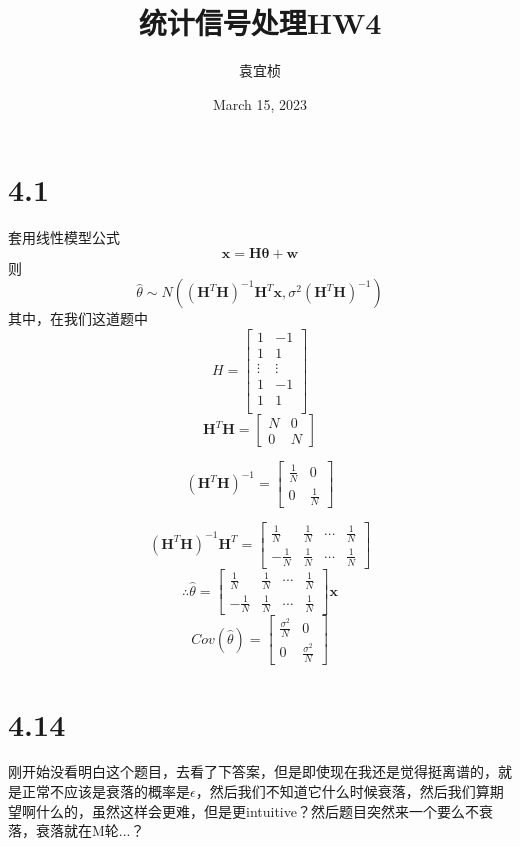 \documentclass{article}
\title{统计信号处理HW4}
\author{袁宜桢}
\date{March 15, 2023}
\begin{document}
\maketitle

\section{4.1}
套用线性模型公式
$$ \bm{x}=\bm{H\theta}+\bm{w} $$
则$$ \hat{\theta}\sim N((\bm{H}^T\bm{H})^{-1}\bm{H}^T\bm{x},\sigma^2(\bm{H}^T\bm{H})^{-1}) $$
其中，在我们这道题中$$H=\left[\begin{array}{cc}
   1  & -1 \\
   1  & 1  \\
   \vdots  & \vdots \\
   1  & -1 \\
   1  & 1  \\
\end{array}\right]$$
$$ \bm{H}^T\bm{H}=\left[ \begin{array}{cc}
   N  & 0 \\
   0  & N
\end{array} \right] $$

$$ (\bm{H}^T\bm{H})^{-1}=\left[ \begin{array}{cc}
   \frac{1}{N}  & 0 \\
   0  & \frac{1}{N}
\end{array} \right] $$

$$ (\bm{H}^T\bm{H})^{-1}\bm{H}^T=\left[ \begin{array}{cccc}
   \frac{1}{N}  & \frac{1}{N} &\cdots &\frac{1}{N}  \\
   -\frac{1}{N}  & \frac{1}{N}&\cdots &\frac{1}{N}
\end{array} \right] $$
$$ \therefore \hat{\theta}=\left[ \begin{array}{cccc}
   \frac{1}{N}  & \frac{1}{N} &\cdots &\frac{1}{N}  \\
   -\frac{1}{N}  & \frac{1}{N}&\cdots &\frac{1}{N}
\end{array} \right]\bm{x}  $$
$$ Cov(\hat{\theta})=\left[ \begin{array}{cc}
   \frac{\sigma^2}{N}  & 0 \\
   0  & \frac{\sigma^2}{N}
\end{array} \right] $$
\section{4.14}
刚开始没看明白这个题目，去看了下答案，但是即使现在我还是觉得挺离谱的，就是正常不应该是衰落的概率是$\epsilon$，然后我们不知道它什么时候衰落，然后我们算期望啊什么的，虽然这样会更难，但是更intuitive？然后题目突然来一个要么不衰落，衰落就在M轮...？
\end{document}
